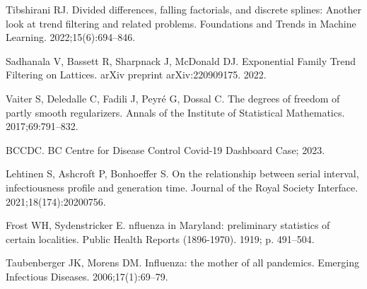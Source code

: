 \documentclass[10pt,letterpaper]{article}
\begin{document}
\begin{thebibliography}{10}
  Tibshirani RJ.
  \newblock Divided differences, falling factorials, and discrete splines:
    Another look at trend filtering and related problems.
  \newblock Foundations and Trends{\textregistered} in Machine Learning.
    2022;15(6):694--846.
  
  Sadhanala V, Bassett R, Sharpnack J, McDonald DJ.
  \newblock Exponential Family Trend Filtering on Lattices.
  \newblock arXiv preprint arXiv:220909175. 2022.
  
  Vaiter S, Deledalle C, Fadili J, Peyr{\'e} G, Dossal C.
  \newblock The degrees of freedom of partly smooth regularizers.
  \newblock Annals of the Institute of Statistical Mathematics. 2017;69:791--832.
  
  BCCDC. {BC} {C}entre for {D}isease {C}ontrol {C}ovid-19 {D}ashboard {C}ase;
    2023.
  
  Lehtinen S, Ashcroft P, Bonhoeffer S.
  \newblock On the relationship between serial interval, infectiousness profile
    and generation time.
  \newblock Journal of the Royal Society Interface. 2021;18(174):20200756.
  
  Frost WH, Sydenstricker E.
  nfluenza in {M}aryland: preliminary statistics of certain
    localities.
  \newblock Public Health Reports (1896-1970). 1919; p. 491--504.
  
  Taubenberger JK, Morens DM.
   {I}nfluenza: the mother of all pandemics.
  \newblock Emerging Infectious Diseases. 2006;17(1):69--79.
  
\end{thebibliography}
  


\end{document}
